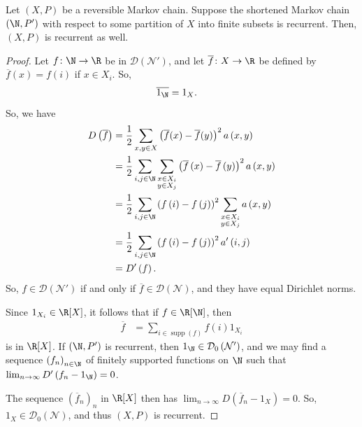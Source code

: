 \documentclass[10pt]{mypackage}
\begin{document}
\begin{theorem}
  Let $\left( X,P \right)$ be a reversible Markov chain. Suppose the shortened Markov chain $\left( \N,P' \right)$ with respect to some partition of $X$ into finite subsets is recurrent. Then, $\left( X,P \right)$ is recurrent as well.
\end{theorem}
\begin{proof}
  Let $f\colon \N\to \R$ be in $\mathcal{D}\left( \mathcal{N}' \right)$, and let $ \overline{f}\colon X\to \R $ be defined by $ \overline{f}(x) = f(i) $ if $x\in X_i$. So,
  \begin{align*}
    \overline{1_{\N}} &= 1_{X}.
  \end{align*}
  So, we have
  \begin{align*}
    D\left( \overline{f} \right) &= \frac{1}{2}\sum_{x,y\in X} \left( \overline{f}(x) - \overline{f}(y) \right)^2 a\left( x,y \right)\\
                                 &= \frac{1}{2}\sum_{i,j\in \N}\sum_{\substack{x\in X_i\\y\in X_j}}\left( \overline{f}\left( x \right) - \overline{f}\left( y \right) \right)^2 a\left( x,y \right)\\
                                 &= \frac{1}{2}\sum_{i,j\in \N} \left( f\left( i \right)-f\left( j \right) \right)^2 \sum_{\substack{x\in X_i\\y\in X_j}} a\left( x,y \right)\\
                                 &= \frac{1}{2}\sum_{i,j\in \N} \left( f\left( i \right) - f\left( j \right) \right)^2 a'\left( i,j \right)\\
                                 &= D'\left( f \right).
  \end{align*}
  So, $f\in \mathcal{D}\left( \mathcal{N}' \right)$ if and only if $ \overline{f}\in \mathcal{D}\left( \mathcal{N} \right) $, and they have equal Dirichlet norms.

  Since $1_{X_i}\in \R[X]$, it follows that if $f\in \R[\N]$, then
  \begin{align*}
    \overline{f} &= \sum_{i\in \operatorname{supp}\left( f \right)} f(i)1_{X_i}
  \end{align*}
  is in $\R[X]$. If $\left( \N,P' \right)$ is recurrent, then $1_{\N}\in \mathcal{D}_0\left( \mathcal{N}' \right)$, and we may find a sequence $\left( f_n \right)_{n\in \N}$ of finitely supported functions on $\N$ such that $\lim_{n\to\infty} D'\left( f_n-1_{\N} \right) = 0$.

  The sequence $\left( \overline{f}_n \right)_n$ in $\R[X]$ then has $\lim_{n\to\infty} D\left( \overline{f}_n - 1_X \right) = 0$. So, $1_X\in \mathcal{D}_0\left( \mathcal{N} \right)$, and thus $\left( X,P \right)$ is recurrent.
\end{proof}
\end{document}
